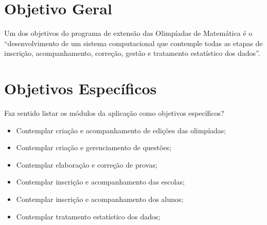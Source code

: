 \section{Objetivo Geral}
\label{sec:org872d0bb}

Um dos objetivos do programa de extensão das Olimpíadas de Matemática é o
“desenvolvimento de um sistema computacional que contemple todas as etapas de
inscrição, acompanhamento, correção, gestão e tratamento estatístico dos
dados”.

\section{Objetivos Específicos}
\label{sec:orgd7fe0f9}

Faz sentido listar os módulos da aplicação como objetivos específicos?

\begin{itemize}
\item Contemplar criação e acompanhamento de edições das olimpíadas;
\item Contemplar criação e gerenciamento de questões;
\item Contemplar elaboração e correção de provas;
\item Contemplar inscrição e acompanhamento das escolas;
\item Contemplar inscrição e acompanhamento dos alunos;
\item Contemplar tratamento estatístico dos dados;
\end{itemize}
